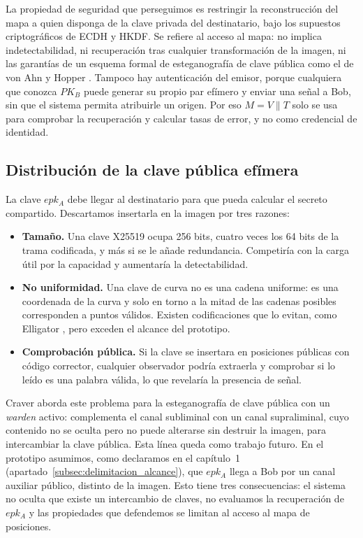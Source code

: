 \documentclass[IB]{TFUOC}%
\begin{document}
La propiedad de seguridad que perseguimos es restringir la reconstrucción del mapa a quien disponga de la clave privada del destinatario, bajo los supuestos criptográficos de ECDH y HKDF. Se refiere al acceso al mapa: no implica indetectabilidad, ni recuperación tras cualquier transformación de la imagen, ni las garantías de un esquema formal de esteganografía de clave pública como el de von Ahn y Hopper \cite{4}. Tampoco hay autenticación del emisor, porque cualquiera que conozca $PK_B$ puede generar su propio par efímero y enviar una señal a Bob, sin que el sistema permita atribuirle un origen. Por eso $M=V\parallel T$ solo se usa para comprobar la recuperación y calcular tasas de error, y no como credencial de identidad.

\subsection{Distribución de la clave pública efímera}
\label{subsec:distribucion_epk}

La clave $epk_A$ debe llegar al destinatario para que pueda calcular el secreto compartido. Descartamos insertarla en la imagen por tres razones:

\begin{itemize}
    \item \textbf{Tamaño.} Una clave X25519 ocupa 256 bits, cuatro veces los 64 bits de la trama codificada, y más si se le añade redundancia. Competiría con la carga útil por la capacidad y aumentaría la detectabilidad.
    \item \textbf{No uniformidad.} Una clave de curva no es una cadena uniforme: es una coordenada de la curva y solo en torno a la mitad de las cadenas posibles corresponden a puntos válidos. Existen codificaciones que lo evitan, como Elligator \cite{bernstein2013elligator}, pero exceden el alcance del prototipo.
    \item \textbf{Comprobación pública.} Si la clave se insertara en posiciones públicas con código corrector, cualquier observador podría extraerla y comprobar si lo leído es una palabra válida, lo que revelaría la presencia de señal.
\end{itemize}

Craver \cite{craver1998} aborda este problema para la esteganografía de clave pública con un \textit{warden} activo: complementa el canal subliminal con un canal supraliminal, cuyo contenido no se oculta pero no puede alterarse sin destruir la imagen, para intercambiar la clave pública. Esta línea queda como trabajo futuro. En el prototipo asumimos, como declaramos en el capítulo~1 (apartado~\ref{subsec:delimitacion_alcance}), que $epk_A$ llega a Bob por un canal auxiliar público, distinto de la imagen. Esto tiene tres consecuencias: el sistema no oculta que existe un intercambio de claves, no evaluamos la recuperación de $epk_A$ y las propiedades que defendemos se limitan al acceso al mapa de posiciones.
\end{document}
